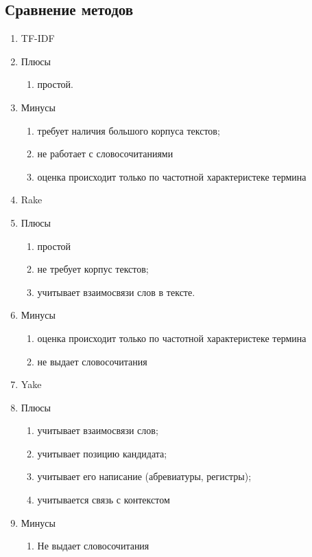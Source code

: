 \subsection{Сравнение методов}
\begin{enumerate}
	\item TF-IDF
	\item Плюсы \begin{enumerate}
		\item простой.
	\end{enumerate}
	\item Минусы \begin{enumerate}
		\item требует наличия большого корпуса текстов;
		\item не работает с словосочитаниями
		\item оценка происходит только по частотной характеристеке термина
	\end{enumerate}
	\item Rake
	\item Плюсы \begin{enumerate}
		\item простой
		\item не требует корпус текстов;
		\item учитывает взаимосвязи слов в тексте.
	\end{enumerate}
	\item Минусы \begin{enumerate}
		\item оценка происходит только по частотной характеристеке термина
		\item не выдает словосочитания
	\end{enumerate}
	\item Yake
	\item Плюсы \begin{enumerate}
		\item учитывает взаимосвязи слов;
		\item учитывает позицию кандидата;
		\item учитывает его написание (абревиатуры, регистры);
		\item учитывается связь с контекстом
	\end{enumerate}
	\item Минусы \begin{enumerate}
		\item Не выдает словосочитания
	\end{enumerate}
\end{enumerate}

